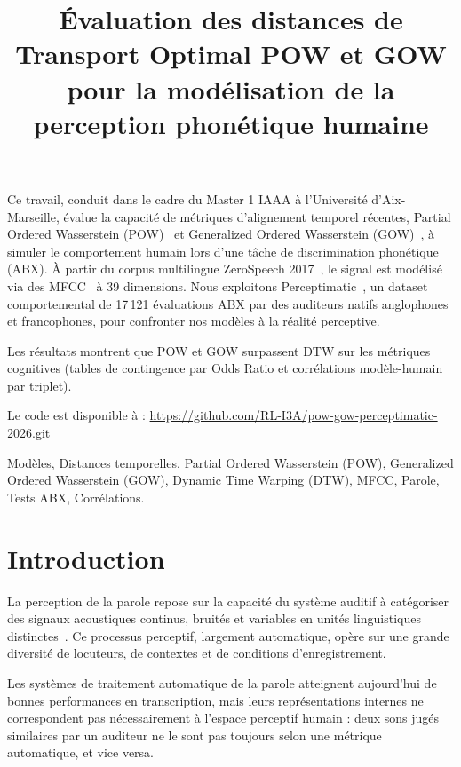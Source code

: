 \documentclass{article}
\title{Évaluation des distances de Transport Optimal POW et GOW\\
pour la modélisation de la perception phonétique humaine}
\begin{document}
\maketitle

\begin{resume}
Ce travail, conduit dans le cadre du Master 1 IAAA à l'Université
d'Aix-Marseille, évalue la capacité de métriques d'alignement temporel
récentes, Partial Ordered Wasserstein (POW)~\cite{pow2024} et
Generalized Ordered Wasserstein (GOW)~\cite{gow2025}, à simuler le
comportement humain lors d'une tâche de discrimination phonétique (ABX).
À partir du corpus multilingue ZeroSpeech 2017~\cite{zerospeech2017}, le
signal est modélisé via des MFCC~\cite{mfcc} à 39 dimensions. Nous
exploitons Perceptimatic~\cite{perceptimatic2020}, un dataset comportemental
de 17\,121 évaluations ABX par des auditeurs natifs anglophones et
francophones, pour confronter nos modèles à la réalité perceptive.

Les résultats montrent que POW et GOW surpassent DTW sur les
métriques cognitives (tables de contingence par Odds Ratio et corrélations
modèle-humain par triplet).

Le code est disponible à :
\url{https://github.com/RL-I3A/pow-gow-perceptimatic-2026.git}
\end{resume}

\begin{motsclefs}
Modèles, Distances temporelles, Partial Ordered Wasserstein (POW), Generalized Ordered Wasserstein (GOW), Dynamic Time Warping (DTW), MFCC, Parole, Tests ABX, Corrélations.
\end{motsclefs}

\section{Introduction}
\label{sec:intro}

La perception de la parole repose sur la capacité du système auditif à
catégoriser des signaux acoustiques continus, bruités et variables en unités
linguistiques distinctes~\cite{phoneme}. Ce processus perceptif, largement automatique,
opère sur une grande diversité de locuteurs, de contextes et de conditions
d'enregistrement.

Les systèmes de traitement automatique de la parole atteignent aujourd'hui
de bonnes performances en transcription, mais leurs représentations internes
ne correspondent pas nécessairement à l'espace perceptif humain : deux sons
jugés similaires par un auditeur ne le sont pas toujours selon une métrique
automatique, et vice versa.
\end{document}

